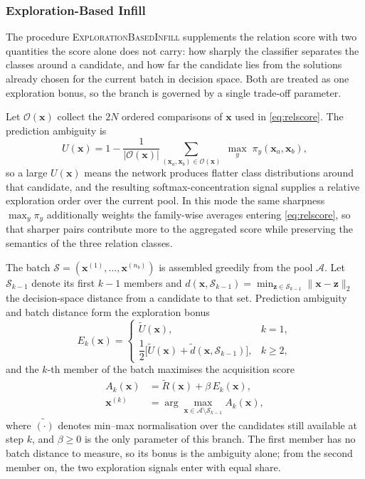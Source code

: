 \documentclass[final,5p,times,twocolumn]{elsarticle}
\newcommand{\vx}{\mathbf{x}}
\newcommand{\vz}{\mathbf{z}}
\begin{document}
\subsubsection{Exploration-Based Infill}
\label{sec:method:cdis:exp}

The procedure \textsc{ExplorationBasedInfill} supplements the relation score
with two quantities the score alone does not carry: how sharply the classifier
separates the classes around a candidate, and how far the candidate lies from
the solutions already chosen for the current batch in decision space. Both are
treated as one exploration bonus, so the branch is governed by a single
trade-off parameter.

Let $\mathcal{O}(\vx)$ collect the $2N$ ordered comparisons of $\vx$ used in
\eqref{eq:relscore}. The prediction ambiguity is
\begin{equation}
U(\vx)=1-\frac{1}{|\mathcal{O}(\vx)|}
\sum_{(\vx_a,\vx_b)\in\mathcal{O}(\vx)}\;
\max_{y}\;\pi_y(\vx_a,\vx_b),
\label{eq:ambig}
\end{equation}
so a large $U(\vx)$ means the network produces flatter class distributions
around that candidate, and the resulting softmax-concentration signal supplies
a relative exploration order over the current pool. In this mode the same
sharpness $\max_y\pi_y$ additionally weights the family-wise averages entering
\eqref{eq:relscore}, so that sharper pairs contribute more to the aggregated
score while preserving the semantics of the three relation classes.

The batch $\mathcal{S}=(\vx^{(1)},\ldots,\vx^{(n_b)})$ is assembled greedily
from the pool $\mathcal{A}$. Let $\mathcal{S}_{k-1}$ denote its first $k-1$
members and
$d(\vx,\mathcal{S}_{k-1})=\min_{\vz\in\mathcal{S}_{k-1}}\|\vx-\vz\|_2$ the
decision-space distance from a candidate to that set. Prediction ambiguity and
batch distance form the exploration bonus
\begin{equation}
E_k(\vx)=
\begin{cases}
\widetilde U(\vx), & k=1,\\[3pt]
\dfrac{1}{2}\bigl[\widetilde U(\vx)
      +\widetilde d(\vx,\mathcal{S}_{k-1})\bigr], & k\geq2,
\end{cases}
\label{eq:bonus}
\end{equation}
and the $k$-th member of the batch maximises the acquisition score
\begin{equation}
\begin{aligned}
A_k(\vx)&=\widetilde R(\vx)+\beta\,E_k(\vx),\\
\vx^{(k)}&=\arg\max_{\vx\in\mathcal{A}\setminus\mathcal{S}_{k-1}}A_k(\vx),
\end{aligned}
\label{eq:expscore}
\end{equation}
where $\widetilde{(\cdot)}$ denotes min--max normalisation over the candidates
still available at step $k$, and $\beta\geq0$ is the only parameter of this
branch. The first member has no batch distance to measure, so its bonus is the
ambiguity alone; from the second member on, the two exploration signals enter
with equal share.
\end{document}
